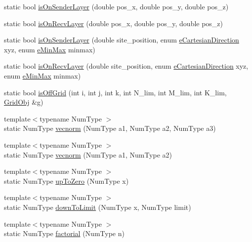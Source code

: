 \begin{DoxyCompactItemize}
\item 
static bool \hyperlink{class_grid_utils_af0692236725709af2d98872805fc84ae}{is\+On\+Sender\+Layer} (double pos\+\_\+x, double pos\+\_\+y, double pos\+\_\+z)
\item 
static bool \hyperlink{class_grid_utils_abfec29d90b6942de2f3c52c225a4d888}{is\+On\+Recv\+Layer} (double pos\+\_\+x, double pos\+\_\+y, double pos\+\_\+z)
\item 
static bool \hyperlink{class_grid_utils_a70a234125350fca607d3943e0f1edd7c}{is\+On\+Sender\+Layer} (double site\+\_\+position, enum \hyperlink{_grid_utils_8h_afbad8e4a2f1e9903755b1bd2fe8273cf}{e\+Cartesian\+Direction} xyz, enum \hyperlink{_grid_utils_8h_a8e005b039da2246588381c4feeeac43f}{e\+Min\+Max} minmax)
\item 
static bool \hyperlink{class_grid_utils_af2b6e1225cab2a840110e2a70f6bd23c}{is\+On\+Recv\+Layer} (double site\+\_\+position, enum \hyperlink{_grid_utils_8h_afbad8e4a2f1e9903755b1bd2fe8273cf}{e\+Cartesian\+Direction} xyz, enum \hyperlink{_grid_utils_8h_a8e005b039da2246588381c4feeeac43f}{e\+Min\+Max} minmax)
\item 
static bool \hyperlink{class_grid_utils_a991a0072d0ee644ce636718b191f97b1}{is\+Off\+Grid} (int i, int j, int k, int N\+\_\+lim, int M\+\_\+lim, int K\+\_\+lim, \hyperlink{class_grid_obj}{Grid\+Obj} \&g)
\item 
{\footnotesize template$<$typename Num\+Type $>$ }\\static Num\+Type \hyperlink{class_grid_utils_a78aa4876d7066bce253c52457e7b901d}{vecnorm} (Num\+Type a1, Num\+Type a2, Num\+Type a3)
\item 
{\footnotesize template$<$typename Num\+Type $>$ }\\static Num\+Type \hyperlink{class_grid_utils_a7a169fc043a585f20936b314def45fe7}{vecnorm} (Num\+Type a1, Num\+Type a2)
\item 
{\footnotesize template$<$typename Num\+Type $>$ }\\static Num\+Type \hyperlink{class_grid_utils_a5a3e26a94e62833f0a9e5a4bda066dac}{up\+To\+Zero} (Num\+Type x)
\item 
{\footnotesize template$<$typename Num\+Type $>$ }\\static Num\+Type \hyperlink{class_grid_utils_abd4068e22339d5272ca551f8cbddec26}{down\+To\+Limit} (Num\+Type x, Num\+Type limit)
\item 
{\footnotesize template$<$typename Num\+Type $>$ }\\static Num\+Type \hyperlink{class_grid_utils_a57edeaeba2d67d187a9edd0b560fe0c2}{factorial} (Num\+Type n)

\end{DoxyCompactItemize}
